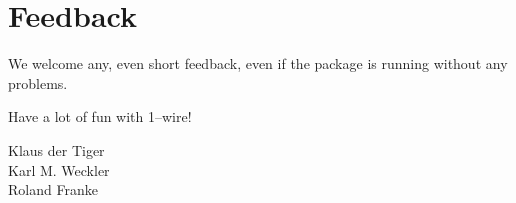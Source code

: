 \section{Feedback}
We welcome any, even short feedback, even if the package is running without
any problems.

Have a lot of fun with 1--wire!

Klaus der Tiger \\
Karl M. Weckler \\
Roland Franke 
